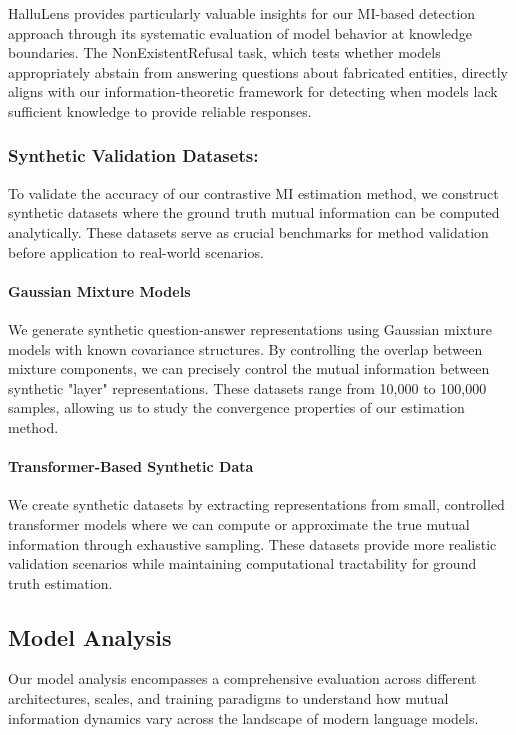 HalluLens provides particularly valuable insights for our MI-based detection approach through its systematic evaluation of model behavior at knowledge boundaries. The NonExistentRefusal task, which tests whether models appropriately abstain from answering questions about fabricated entities, directly aligns with our information-theoretic framework for detecting when models lack sufficient knowledge to provide reliable responses.

\subsubsection{Synthetic Validation Datasets:}

To validate the accuracy of our contrastive MI estimation method, we construct synthetic datasets where the ground truth mutual information can be computed analytically. These datasets serve as crucial benchmarks for method validation before application to real-world scenarios.

\paragraph{Gaussian Mixture Models}
We generate synthetic question-answer representations using Gaussian mixture models with known covariance structures. By controlling the overlap between mixture components, we can precisely control the mutual information between synthetic "layer" representations. These datasets range from 10,000 to 100,000 samples, allowing us to study the convergence properties of our estimation method.

\paragraph{Transformer-Based Synthetic Data}
We create synthetic datasets by extracting representations from small, controlled transformer models where we can compute or approximate the true mutual information through exhaustive sampling. These datasets provide more realistic validation scenarios while maintaining computational tractability for ground truth estimation.

\subsection{Model Analysis}
\label{subsec:model_analysis}

Our model analysis encompasses a comprehensive evaluation across different architectures, scales, and training paradigms to understand how mutual information dynamics vary across the landscape of modern language models.

